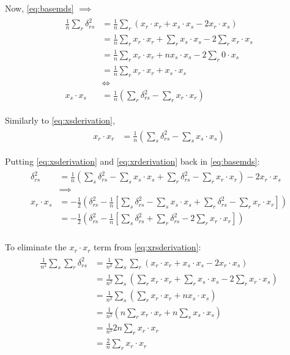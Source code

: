 \documentclass[12pt]{article}
\begin{document}
Now, \ref{eq:basemds} $\implies$
\begin{align}
\label{eq:xsderivation}
\begin{split}
\frac{1}{n} \sum_r \delta_{rs}^2
&= \frac{1}{n} \sum_r (x_r\cdot x_r + x_s\cdot x_s -2x_r\cdot x_s) \\
&= \frac{1}{n} \sum_r x_r\cdot x_r + \sum_r x_s\cdot x_s -2 \sum_r x_r\cdot x_s \\
&= \frac{1}{n} \sum_r x_r\cdot x_r + nx_s\cdot x_s -2 \sum_r 0\cdot x_s \\
&= \frac{1}{n} \sum_r x_r\cdot x_r + x_s\cdot x_s \\
&\iff \\
x_s\cdot x_s &= \frac{1}{n} (\sum_r \delta_{rs}^2 - \sum_r x_r\cdot x_r)
\end{split}
\end{align}

Similarly to \ref{eq:xsderivation},
\begin{align}
\label{eq:xrderivation}
\begin{split}
x_r\cdot x_r &= \frac{1}{n} (\sum_s \delta_{rs}^2 - \sum_s x_s\cdot x_s)
\end{split}
\end{align}

Putting \ref{eq:xsderivation} and \ref{eq:xrderivation} back in \ref{eq:basemds}:
\begin{align}
\label{eq:xrsderivation}
\begin{split}
\delta_{rs}^2 &= \frac{1}{n} (\sum_s \delta_{rs}^2 - \sum_s x_s\cdot x_s + \sum_r \delta_{rs}^2 - \sum_r x_r\cdot x_r) -2x_r\cdot x_s \\
&\implies \\
x_r\cdot x_s &= -\frac{1}{2} (\delta_{rs}^2 - \frac{1}{n} [\sum_s \delta_{rs}^2 - \sum_s x_s\cdot x_s + \sum_r \delta_{rs}^2 - \sum_r x_r\cdot x_r])\\
&= -\frac{1}{2} (\delta_{rs}^2 - \frac{1}{n} [\sum_s \delta_{rs}^2 + \sum_r \delta_{rs}^2 - 2\sum_r x_r\cdot x_r])\\
\end{split}
\end{align}

To eliminate the $x_r\cdot x_r$ term from \ref{eq:xrsderivation}:
\begin{align}
\label{eq:msd-xrr}
\begin{split}
\frac{1}{n^2} \sum_s\sum_r\delta_{rs}^2 &= \frac{1}{n^2} \sum_s\sum_r(x_r\cdot x_r + x_s\cdot x_s -2x_r\cdot x_s)\\
&= \frac{1}{n^2}\sum_s(\sum_r x_r\cdot x_r + \sum_r x_s\cdot x_s -2\sum_r x_r\cdot x_s)\\
&= \frac{1}{n^2}\sum_s(\sum_r x_r\cdot x_r + n x_s\cdot x_s) \\
&= \frac{1}{n^2}(n \sum_r x_r\cdot x_r + n \sum_s x_s \cdot x_s) \\
&= \frac{1}{n^2} 2n \sum_r x_r\cdot x_r \\
&= \frac{2}{n} \sum_r x_r\cdot x_r
\end{split}
\end{align}
\end{document}
